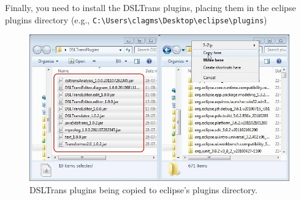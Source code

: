 Finally, you need to install the DSLTrans plugins, placing them in the
eclipse plugins directory (e.g., \verb=C:\Users\clagms\Desktop\eclipse\plugins=)


\begin{figure}[h]
\begin{center}
  \includegraphics[width=\textwidth]{imgs/dsltrans_plugins_cpy.jpg}
  \caption{DSLTrans plugins being copied to eclipse's plugins directory.}
  \label{fig:dsltrans_plugins_cpy}
\end{center}
\end{figure}

\clearpage

